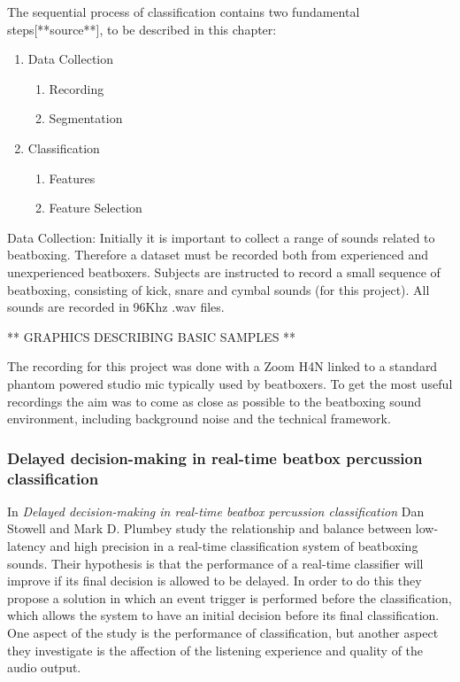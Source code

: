 The sequential process of classification contains two fundamental steps[**source**], to be described in this chapter: 
\begin{enumerate}
	\item Data Collection
		\begin{enumerate}
			\item Recording
			\item Segmentation
		\end{enumerate}
	\item Classification
		\begin{enumerate}
			\item Features
			\item Feature Selection
		\end{enumerate}
\end{enumerate}

Data Collection: 
Initially it is important to collect a range of sounds related to beatboxing. Therefore a dataset must be recorded both from experienced and unexperienced beatboxers. Subjects are instructed to record a small sequence of beatboxing, consisting of kick, snare and cymbal sounds (for this project). All sounds are recorded in 96Khz .wav files. 

** GRAPHICS DESCRIBING BASIC SAMPLES ** 

The recording for this project was done with a Zoom H4N linked to a standard phantom powered studio mic typically used by beatboxers. To get the most useful recordings the aim was to come as close as possible to the beatboxing sound environment, including background noise and the technical framework.\\
\subsubsection{Delayed decision-making in real-time beatbox percussion classification}
In \textit{Delayed decision-making in real-time beatbox percussion classification} Dan Stowell and Mark D. Plumbey study the relationship and balance between low-latency and high precision in a real-time classification system of beatboxing sounds. Their hypothesis is that the performance of a real-time classifier will improve if its final decision is allowed to be delayed. 
In order to do this they propose a solution in which an event trigger is performed before the classification, which allows the system to have an initial decision before its final classification. One aspect of the study is the performance of classification, but another aspect they investigate is the affection of the listening experience and quality of the audio output. 

